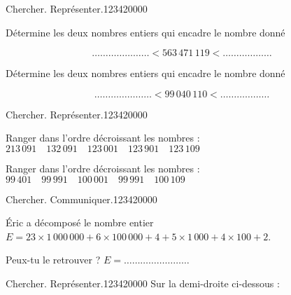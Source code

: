  
\begin{pageParcourst}


\begin{ExoCt}{Chercher. Représenter.}{1234}{2}{0}{0}{0}{0}

Détermine les deux nombres entiers qui encadre le nombre donné  \vspace{0.1cm}

$$\ldots\ldots\ldots\ldots\ldots\ldots\ldots < 563\,471\,119< \ldots\ldots\ldots\ldots\ldots\ldots$$

Détermine les deux nombres entiers qui encadre le nombre donné  \vspace{0.1cm}

$$\ldots\ldots\ldots\ldots\ldots\ldots\ldots < 99\,040\,110< \ldots\ldots\ldots\ldots\ldots\ldots$$
 
\end{ExoCt}

\begin{ExoCt}{Chercher. Représenter.}{1234}{2}{0}{0}{0}{0}

Ranger dans l'ordre décroissant les nombres : $ 213\,091 \quad 132\,091 \quad 123\,001 \quad 123\,901\quad 123\,109$ \vspace{0.2cm}
  \vspace{0.1cm}

Ranger dans l'ordre décroissant les nombres : $ 99\,401 \quad 99\,991 \quad 100\,001 \quad 99\,991\quad 100\,109$ \vspace{0.1cm}

 
\end{ExoCt}


\begin{ExoCt}{Chercher. Communiquer.}{1234}{2}{0}{0}{0}{0}
 
Éric a décomposé le nombre entier  $E = 23\times 1\,000\,000 + 6\times 100\,000 + 4 +  5\times 1\,000  + 4\times 100 +  2$. \vspace{0.2cm}

Peux-tu le retrouver ? $E = \ldots\ldots\ldots\ldots\ldots\ldots\ldots\ldots $
\end{ExoCt}

\begin{ExoCt}{Chercher. Représenter.}{1234}{2}{0}{0}{0}{0}
 Sur la demi-droite ci-dessous :


\end{ExoCt}
\end{pageParcourst}
